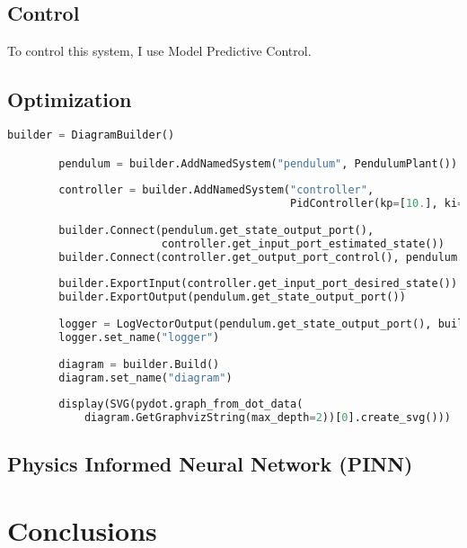 \documentclass{article}
\begin{document}
    \subsection*{Control}

    To control this system, I use Model Predictive Control.

    \subsection*{Optimization}

    \begin{lstlisting}[language=Python]
        builder = DiagramBuilder()

        pendulum = builder.AddNamedSystem("pendulum", PendulumPlant())
        
        controller = builder.AddNamedSystem("controller",
                                            PidController(kp=[10.], ki=[1.], kd=[1.]))
        
        builder.Connect(pendulum.get_state_output_port(),
                        controller.get_input_port_estimated_state())
        builder.Connect(controller.get_output_port_control(), pendulum.get_input_port())
        
        builder.ExportInput(controller.get_input_port_desired_state())
        builder.ExportOutput(pendulum.get_state_output_port())
        
        logger = LogVectorOutput(pendulum.get_state_output_port(), builder)
        logger.set_name("logger")
        
        diagram = builder.Build()
        diagram.set_name("diagram")
        
        display(SVG(pydot.graph_from_dot_data(
            diagram.GetGraphvizString(max_depth=2))[0].create_svg()))
    \end{lstlisting}

    \subsection*{Physics Informed Neural Network (PINN)}

    

\section*{Conclusions}
\end{document}
